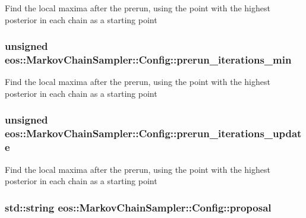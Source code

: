 \label{classeos_1_1MarkovChainSampler_1_1Config_aed5faf2c2cd03d33d5acb79fc16132a4}
Find the local maxima after the prerun, using the point with the highest posterior in each chain as a starting point \hypertarget{classeos_1_1MarkovChainSampler_1_1Config_af76602d7053b0f599295e1175718cb22}{
\subsubsection[{prerun\_\-iterations\_\-min}]{\setlength{\rightskip}{0pt plus 5cm}unsigned {\bf eos::MarkovChainSampler::Config::prerun\_\-iterations\_\-min}}}
\label{classeos_1_1MarkovChainSampler_1_1Config_af76602d7053b0f599295e1175718cb22}
Find the local maxima after the prerun, using the point with the highest posterior in each chain as a starting point \hypertarget{classeos_1_1MarkovChainSampler_1_1Config_aac94024909568d9ca6e59108db400c6d}{
\subsubsection[{prerun\_\-iterations\_\-update}]{\setlength{\rightskip}{0pt plus 5cm}unsigned {\bf eos::MarkovChainSampler::Config::prerun\_\-iterations\_\-update}}}
\label{classeos_1_1MarkovChainSampler_1_1Config_aac94024909568d9ca6e59108db400c6d}
Find the local maxima after the prerun, using the point with the highest posterior in each chain as a starting point \hypertarget{classeos_1_1MarkovChainSampler_1_1Config_a7184404972d7e56da2a78218555c1f97}{
\subsubsection[{proposal}]{\setlength{\rightskip}{0pt plus 5cm}std::string {\bf eos::MarkovChainSampler::Config::proposal}}}
\label{classeos_1_1MarkovChainSampler_1_1Config_a7184404972d7e56da2a78218555c1f97}


